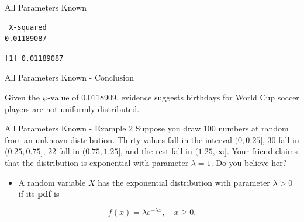 \documentclass[
  ignorenonframetext,
]{beamer}
\newenvironment{Shaded}{\begin{snugshade}}{\end{snugshade}}
\newcommand{\AttributeTok}[1]{\textcolor[rgb]{0.13,0.29,0.53}{#1}}
\newcommand{\CommentTok}[1]{\textcolor[rgb]{0.56,0.35,0.01}{\textit{#1}}}
\newcommand{\ConstantTok}[1]{\textcolor[rgb]{0.56,0.35,0.01}{#1}}
\newcommand{\DecValTok}[1]{\textcolor[rgb]{0.00,0.00,0.81}{#1}}
\newcommand{\FunctionTok}[1]{\textcolor[rgb]{0.13,0.29,0.53}{\textbf{#1}}}
\newcommand{\NormalTok}[1]{#1}
\newcommand{\OtherTok}[1]{\textcolor[rgb]{0.56,0.35,0.01}{#1}}
\newcommand{\SpecialCharTok}[1]{\textcolor[rgb]{0.81,0.36,0.00}{\textbf{#1}}}
\providecommand{\tightlist}{%
  \setlength{\itemsep}{0pt}\setlength{\parskip}{0pt}}
\begin{document}
\begin{frame}[fragile]{All Parameters Known}
\label{all-parameters-known-4}
\begin{Shaded}
\end{Shaded}

\begin{verbatim}
 X-squared 
0.01189087 
\end{verbatim}

\begin{Shaded}
\end{Shaded}

\begin{verbatim}
[1] 0.01189087
\end{verbatim}
\end{frame}

\begin{frame}{All Parameters Known - Conclusion}
\label{all-parameters-known---conclusion}
\begin{tcolorbox}
Given the $\wp\text{-value}$ of $0.0118909$, evidence suggests birthdays for World Cup soccer players are not uniformly distributed.
\end{tcolorbox}
\end{frame}

\begin{frame}{All Parameters Known - Example 2}
\label{all-parameters-known---example-2}
Suppose you draw 100 numbers at random from an unknown distribution.
Thirty values fall in the interval \((0, 0.25]\), 30 fall in
\((0.25, 0.75]\), 22 fall in \((0.75, 1.25]\), and the rest fall in
\((1.25, \infty]\). Your friend claims that the distribution is
exponential with parameter \(\lambda = 1\). Do you believe her?

\begin{itemize}
\tightlist
\item
  A random variable \(X\) has the exponential distribution with
  parameter \(\lambda > 0\) if its \textbf{pdf} is
\end{itemize}

\[f(x) = \lambda e^{-\lambda x},\quad x \geq 0.\]
\end{frame}
\end{document}

